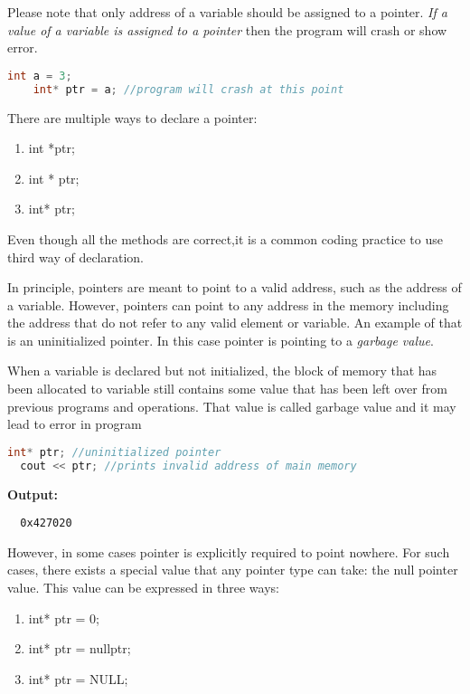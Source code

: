 \documentclass[11pt,fleqn]{book} %
\begin{document}
\begin{tcolorbox}[width=\textwidth,colback={white},title={KEYNOTE},colbacktitle=purple!50!white,coltitle=black]    
  Please note that only address of a variable should be assigned to a pointer. \emph{If a value of a variable is assigned to a pointer} then the program will crash or show error.

  \begin{lstlisting}[language=C++, caption = Incorrect initialization of a pointer]
    int a = 3;
    int* ptr = a; //program will crash at this point
  \end{lstlisting}
  
  \hfill \break
  There are multiple ways to declare a pointer:
  \begin{enumerate}
  \item int *ptr;
  \item int * ptr;
  \item int* ptr;
  \end{enumerate}
  Even though all the methods are correct,it is a common coding practice to use third way of declaration.
\end{tcolorbox}

\hfill \break
In principle, pointers are meant to point to a valid address, such as the address of a variable. However, pointers can point to any address in the memory including the address that do not refer to any valid element or variable. An example of that is an uninitialized pointer. In this case pointer is pointing to a \emph{garbage value}. \\

\begin{definition}
  When a variable is declared but not initialized, the block of memory that has been allocated to variable still contains some value that has been left over from previous programs and operations. That value is called garbage value and it may lead to error in program
\end{definition}


\begin{lstlisting}[language=C++, caption = Un-initialize pointer]
  int* ptr; //uninitialized pointer
  cout << ptr; //prints invalid address of main memory
\end{lstlisting}
\textbf{Output:}
\begin{lstlisting}
  0x427020 
\end{lstlisting}


\hfill \break
However, in some cases pointer is explicitly required to point nowhere. For such cases, there exists a special value that any pointer type can take: the null pointer value. This value can be expressed in three ways:
\begin{enumerate}
\item int* ptr = 0;
\item int* ptr = nullptr;
\item int* ptr = NULL;
\end{enumerate}
\end{document}
